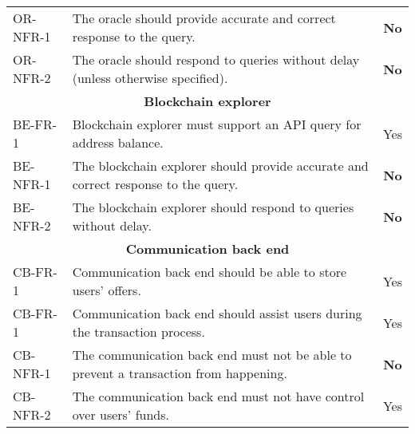 \begin{table}[H]
\begin{tabularx}{\textwidth}{|l X c|}
    OR-NFR-1&The oracle should provide accurate and correct response to the query.&\textbf{No}\\
    OR-NFR-2&The oracle should respond to queries without delay (unless otherwise specified).&\textbf{No}\\
    \multicolumn{3}{|c|}{\textbf{Blockchain explorer}}\\
    BE-FR-1&Blockchain explorer must support an API query for address balance.&Yes\\
    BE-NFR-1&The blockchain explorer should provide accurate and correct response to the query.&\textbf{No}\\
    BE-NFR-2&The blockchain explorer should respond to queries without delay.&\textbf{No}\\
    \multicolumn{3}{|c|}{\textbf{Communication back end}}\\
    CB-FR-1&Communication back end should be able to store users' offers.&Yes\\
    CB-FR-1&Communication back end should assist users during the transaction process.&Yes\\
    CB-NFR-1&The communication back end must not be able to prevent a transaction from happening.&\textbf{No}\\
    CB-NFR-2&The communication back end must not have control over users' funds.&Yes\\
    \hline
    \end{tabularx}
    \label{tab:component-reqs-eval}
\end{table}
